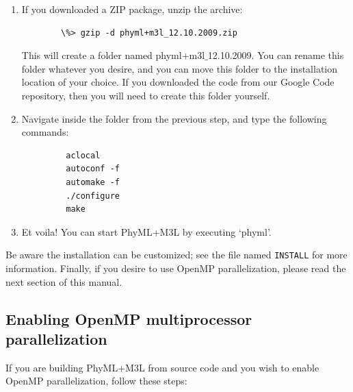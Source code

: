 \documentclass[11pt]{article}
\begin{document}
\begin{enumerate}
\item If you downloaded a ZIP package, unzip the archive:

\begin{verbatim}
        \%> gzip -d phyml+m3l_12.10.2009.zip
\end{verbatim}

This will create a folder named phyml$+$m3l$\_$12.10.2009.  You can rename this folder whatever you desire, and you can move this folder to the installation location of your choice.  If you downloaded the code from our Google Code repository, then you will need to create this folder yourself.

\item Navigate inside the folder from the previous step, and type the following commands:

\begin{verbatim}
         aclocal
         autoconf -f
         automake -f
         ./configure
         make
\end{verbatim}

\item Et voila!  You can start PhyML+M3L by executing `phyml'.

\end{enumerate}

\noindent Be aware the installation can be customized; see the file named \texttt{INSTALL} for more information.  Finally, if you desire to use OpenMP parallelization, please read the next section of this manual.


\subsection{Enabling OpenMP multiprocessor parallelization}

If you are building PhyML+M3L from source code and you wish to enable OpenMP parallelization, follow these steps:
\end{document}
